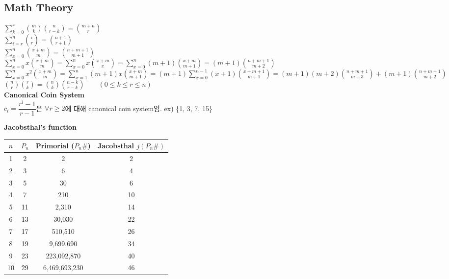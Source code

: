 \subsection{Math Theory}

\noindent
$\displaystyle\sum_{k=0}^{r} \binom{m}{k} \binom{n}{r-k} = \binom{m+n}{r}$ \\ 
$\displaystyle\sum_{i=r}^{n} \binom{i}{r} = \binom{n+1}{r+1}$ \\
$\displaystyle\sum_{x=0}^{n} \binom{x+m}{m} = \binom{n+m+1}{m+1}$ \\ 
$\displaystyle\sum_{x=0}^{n} x \binom{x+m}{m} = \displaystyle\sum_{x=0}^{n} x \binom{x+m}{x} = \displaystyle\sum_{x=0}^{n} (m+1) \binom{x+m}{m+1} = (m+1) \binom{n+m+1}{m+2}$ \\ 
$\displaystyle\sum_{x=0}^{n} x^2 \binom{x+m}{m} = \displaystyle\sum_{x=1}^{n} (m+1)x \binom{x+m}{m+1} = (m+1) \displaystyle\sum_{x=0}^{n-1} (x+1) \binom{x+m+1}{m+1} = (m+1)(m+2) \binom{n+m+1}{m+3} + (m+1) \binom{n+m+1}{m+2}$
$\displaystyle\binom{n}{r}\binom{r}{k} = \binom{n}{k}\binom{n-k}{r-k} \qquad (0 \le k \le r \le n)$ \\

\vspace{5pt}
\noindent \textbf{Canonical Coin System} \\
$c_i = \dfrac{r^i - 1}{r - 1}$은 $\forall r \ge 2$에 대해 canonical coin system임. ex) \{1, 3, 7, 15\}

\vspace{5pt}
\noindent \textbf{Jacobsthal's function} \\
\begin{flushleft}
\noindent
\begin{tabular}{|c|c|c|c|}
\hline
$n$ & $P_n$ & Primorial ($P_n\#$) & Jacobsthal $j(P_n\#)$ \\ \hline
1 & 2 & 2 & 2 \\ \hline
2 & 3 & 6 & 4 \\ \hline
3 & 5 & 30 & 6 \\ \hline
4 & 7 & 210 & 10 \\ \hline
5 & 11 & 2,310 & 14 \\ \hline
6 & 13 & 30,030 & 22 \\ \hline
7 & 17 & 510,510 & 26 \\ \hline
8 & 19 & 9,699,690 & 34 \\ \hline
9 & 23 & 223,092,870 & 40 \\ \hline
10 & 29 & 6,469,693,230 & 46 \\ \hline
\end{tabular}
\end{flushleft}

